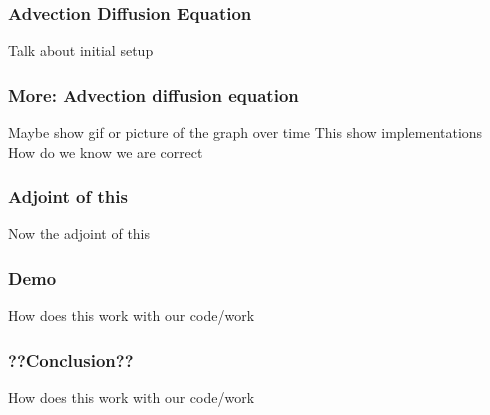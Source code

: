 \documentclass{beamer}
\begin{document}
\begin{frame}
\frametitle{Advection Diffusion Equation}
Talk about initial setup
\end{frame}

\begin{frame}
\frametitle{More: Advection diffusion equation}
Maybe show gif or picture of the graph over time
This show implementations
How do we know we are correct
\end{frame}

\begin{frame}
\frametitle{Adjoint of this}
Now the adjoint of this
\end{frame}

\begin{frame}
\frametitle{Demo}
How does this work with our code/work
\end{frame}

\begin{frame}
\frametitle{??Conclusion??}
How does this work with our code/work
\end{frame}
\end{document}
